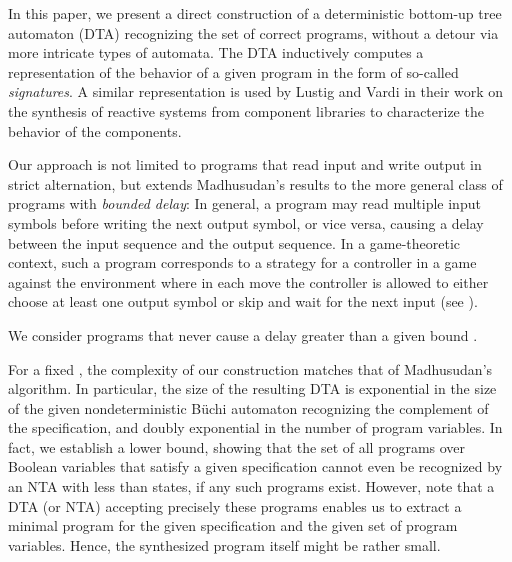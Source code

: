 \documentclass[submission,copyright,creativecommons]{eptcs}
\newcommand{\ignore}[1]{}
\begin{document}
In this paper, we present a direct construction of a deterministic bottom-up
tree automaton (DTA) recognizing the set of correct programs, without a detour
via more intricate types of automata.
The DTA inductively computes a representation of the behavior of a given
program in the form of so-called \emph{signatures}.
A similar representation is used by Lustig and Vardi in their work on the
synthesis of reactive systems from component libraries
\cite{Lustig09} to characterize the behavior of\ignore{TODO: Adjective here?}
the components.

Our approach is not limited to programs that read input and write output in
strict alternation, but extends Madhusudan's results to the more general class
of programs with \emph{bounded delay}:
In general, a program may read multiple input symbols before writing the next
output symbol, or vice versa, causing a delay between the input sequence and
the output sequence.
In a game-theoretic context, such a program corresponds to a strategy for a
controller in a game against the environment where in each move
the controller is allowed to either choose at least one output symbol or
skip and wait for the next input (see \cite{Holtmann10}).
\ignore{Reading multiple input symbols in a row is necessary to satisfy specifications
that require a certain amount of lookahead on the input sequence.
On the other hand, writing multiple output symbols in a row may
reduce\ignore{TODO! Other word?} the required number of program variables,
because once an output symbol has been written, no information about that
symbol has to be stored anymore.}
We consider programs that never cause a delay greater than a given bound
.

\ignore{
Note that reading multiple input symbols in a row can be necessary if the
specification requires a certain amount of lookahead on the input sequence.
On the other hand, writing multiple output symbols before reading the next
input symbol may reduce the required number of program variables.
For example, consider the specification that requires for some fixed
 that the th output symbol agrees with the th
input symbol, for all .
Any program that reads input and writes output in strict alternation needs at
least  Boolean variables to satisfy the specification.
However, if the first  output symbols are written
before reading the first input symbol, a single variable suffices.
}

For a fixed , the complexity of our construction matches that of
Madhusudan's algorithm.
In particular, the size of the resulting DTA is exponential in the size of the
given nondeterministic Büchi automaton recognizing the complement of the
specification, and doubly exponential in the number of program variables.
In fact, we establish a lower bound, showing that the set of all programs
over  Boolean variables that satisfy a given specification cannot even be
recognized by an NTA with less than  states,
if any such programs exist.
However, note that a DTA (or NTA) accepting precisely these programs enables
us to extract a minimal program for the given specification and the given set
of program variables.
Hence, the synthesized program itself might be rather small.
\end{document}
